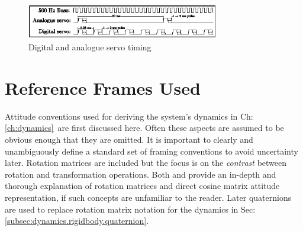 \begin{figure}
\centering
\includegraphics[width=0.75\textwidth]{figs/servo-timing}
\caption{Digital and analogue servo timing}
\label{fig:servo-timing}
\vspace{-20pt}
\end{figure}
\section{Reference Frames Used}
\label{sec:proto.conventions}
Attitude conventions used for deriving the system's dynamics in Ch:\ref{ch:dynamics}~are first discussed here. Often these aspects are assumed to be obvious enough that they are omitted. It is important to clearly and unambiguously define a standard set of framing conventions to avoid uncertainty later. Rotation matrices are included but the focus is on the \emph{contrast} between rotation and transformation operations. Both \cite{spacecraftattitutdequaternions} and \cite{rigidbodylecture} provide an in-depth and thorough explanation of rotation matrices and direct cosine matrix attitude representation, if such concepts are unfamiliar to the reader. Later quaternions are used to replace rotation matrix notation for the dynamics in Sec:\ref{subsec:dynamics.rigidbody.quaternion}.
